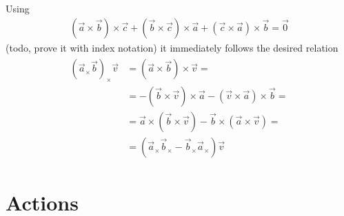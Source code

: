 \documentclass[letterpaper,10pt,english]{jupyterBook}
\begin{document}
\sphinxAtStartPar
Using
\begin{equation*}
\begin{split}(\vec{a} \times \vec{b}) \times \vec{c} + (\vec{b} \times \vec{c}) \times \vec{a} + (\vec{c} \times \vec{a}) \times \vec{b} = \vec{0} \end{split}
\end{equation*}
\sphinxAtStartPar
(todo, prove it with index notation) it immediately follows the desired relation
\begin{equation*}
\begin{split}\begin{aligned}
  (\vec{a}_\times \vec{b})_{\times} \vec{v}
  & = ( \vec{a} \times \vec{b} ) \times \vec{v} = \\
  & = - ( \vec{b} \times \vec{v} ) \times \vec{a} - ( \vec{v} \times \vec{a} ) \times \vec{b} = \\
  & = \vec{a} \times ( \vec{b} \times \vec{v} ) - \vec{b} \times ( \vec{a} \times \vec{v} ) = \\
  & = \left( \vec{a}_{\times} \vec{b}_\times - \vec{b}_\times \vec{a}_\times \right) \vec{v}
\end{aligned}\end{split}
\end{equation*}
\sphinxstepscope




\chapter{Actions}
\label{\detokenize{ch/actions:actions}}\label{\detokenize{ch/actions:classical-mechanics-actions}}\label{\detokenize{ch/actions::doc}}
\end{document}
